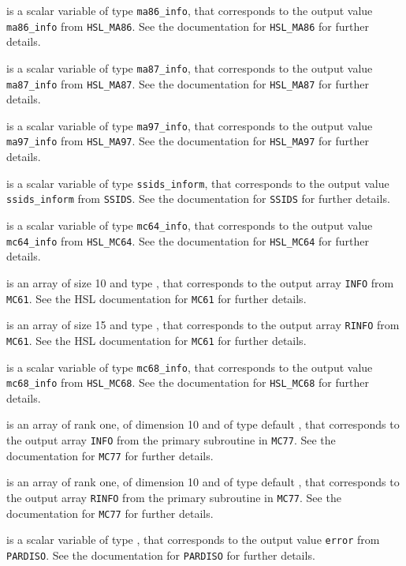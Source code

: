 \documentclass{galahad}
\begin{document}
\begin{description}
 is a scalar variable of type {\tt ma86\_info},
that corresponds to the output value {\tt ma86\_info}
from {\tt HSL\_MA86}. See the documentation for {\tt HSL\_MA86} for further
details.

 is a scalar variable of type {\tt ma87\_info},
that corresponds to the output value {\tt ma87\_info}
from {\tt HSL\_MA87}. See the documentation for {\tt HSL\_MA87} for further
details.

 is a scalar variable of type {\tt ma97\_info},
that corresponds to the output value {\tt ma97\_info}
from {\tt HSL\_MA97}. See the documentation for {\tt HSL\_MA97} for further
details.

 is a scalar variable of type {\tt ssids\_inform},
that corresponds to the output value {\tt ssids\_inform}
from {\tt SSIDS}. See the documentation for {\tt SSIDS} for further
details.

 is a scalar variable of type {\tt mc64\_info},
that corresponds to the output value {\tt mc64\_info}
from {\tt HSL\_MC64}. See the documentation for {\tt HSL\_MC64} for further
details.

 is an array of size 10 and type \integer,
that corresponds to the output array {\tt INFO}
from {\tt MC61}. See the HSL documentation for {\tt MC61} for further
details.

 is an array of size 15 and type \realdp,
that corresponds to the output array {\tt RINFO}
from {\tt MC61}. See the HSL documentation for {\tt MC61} for further
details.

 is a scalar variable of type {\tt mc68\_info},
that corresponds to the output value {\tt mc68\_info}
from {\tt HSL\_MC68}. See the documentation for {\tt HSL\_MC68} for further
details.

 is an array of rank one, of dimension 10 and of
type default \integer, that corresponds to the output array {\tt INFO}
from the primary subroutine in {\tt MC77}. See the documentation for
{\tt MC77} for further details.

 is an array of rank one, of dimension 10 and of
type default \realdp, that corresponds to the output array {\tt RINFO}
from the primary subroutine in {\tt MC77}. See the documentation for
{\tt MC77} for further details.

 is a scalar variable of type \integer,
that corresponds to the output value {\tt error}
from {\tt PARDISO}. See the documentation for {\tt PARDISO} for further
details.


\end{description}
\end{document}
